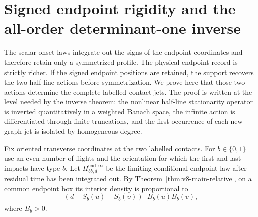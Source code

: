 \section{Signed endpoint rigidity and the all-order determinant-one inverse}
\label{sec:v27-signed-rigidity}
\label{sec:v22-signed-rigidity}

The scalar onset laws integrate out the signs of the endpoint coordinates and
therefore retain only a symmetrized profile.  The physical endpoint record is
strictly richer.  If the signed endpoint positions are retained, the support
recovers the two half-line actions before symmetrization.  We prove here that
those two actions determine the complete labelled contact jets.  The proof is
written at the level needed by the inverse theorem: the nonlinear half-line
stationarity operator is inverted quantitatively in a weighted Banach space,
the infinite action is differentiated through finite truncations, and the
first occurrence of each new graph jet is isolated by homogeneous degree.

Fix oriented transverse coordinates at the two labelled contacts.  For
$b\in\{0,1\}$ use an even number of flights and the orientation for which the
first and last impacts have type $b$.  Let
$\Pi^{\mathrm{end},\infty}_{bb,d}$ be the limiting conditional endpoint law
after residual time has been integrated out.  By
Theorem~\ref{thm:v8-main-relative}, on a common endpoint box its interior
density is proportional to
\begin{equation}\label{eq:v22-signed-endpoint-density}
       (d-S_b(u)-S_b(v))_+B_b(u)B_b(v),
\end{equation}
where $B_b>0$.

